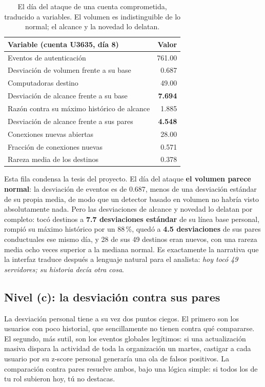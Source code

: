 \documentclass[12pt, a4paper]{article}
\begin{document}
\begin{table}[!htb]
\centering
\small
\setlength{\tabcolsep}{8pt}
\begin{tabular}{lr}
\toprule
\textbf{Variable (cuenta U3635, día 8)} & \textbf{Valor} \\
\midrule
Eventos de autenticación & 761.00 \\
Desviación de volumen frente a su base & 0.687 \\
\midrule
Computadoras destino & 49.00 \\
Desviación de alcance frente a su base & \textbf{7.694} \\
Razón contra su máximo histórico de alcance & 1.885 \\
Desviación de alcance frente a sus pares & \textbf{4.548} \\
\midrule
Conexiones nuevas abiertas & 28.00 \\
Fracción de conexiones nuevas & 0.571 \\
Rareza media de los destinos & 0.378 \\
\bottomrule
\end{tabular}
\caption{El día del ataque de una cuenta comprometida, traducido a variables. El volumen es
indistinguible de lo normal; el alcance y la novedad lo delatan.}
\label{tab:caso}
\end{table}

Esta fila condensa la tesis del proyecto. El día del ataque \textbf{el volumen parece normal}: la
desviación de eventos es de 0.687, menos de una desviación estándar de su propia media, de modo que
un detector basado en volumen no habría visto absolutamente nada. Pero las desviaciones de alcance y
novedad lo delatan por completo: tocó destinos a \textbf{7.7 desviaciones estándar} de su línea base
personal, rompió su máximo histórico por un 88\,\%, quedó a \textbf{4.5 desviaciones} de sus pares
conductuales ese mismo día, y 28 de sus 49 destinos eran nuevos, con una rareza media ocho veces
superior a la mediana normal. Es exactamente la narrativa que la interfaz traduce después a lenguaje
natural para el analista: \textit{hoy tocó 49 servidores; su historia decía otra cosa}.

\subsection{Nivel (c): la desviación contra sus pares}

La desviación personal tiene a su vez dos puntos ciegos. El primero son los usuarios con poco
historial, que sencillamente no tienen contra qué compararse. El segundo, más sutil, son los eventos
globales legítimos: si una actualización masiva dispara la actividad de toda la organización un
martes, castigar a cada usuario por su z-score personal generaría una ola de falsos positivos. La
comparación contra pares resuelve ambos, bajo una lógica simple: si todos los de tu rol subieron hoy,
tú no destacas.
\end{document}
